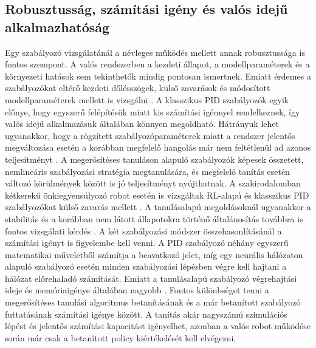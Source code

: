 \documentclass[12pt,a4paper]{report}
\begin{document}
	\subsection{Robusztusság, számítási igény és valós idejű alkalmazhatóság}
	Egy szabályozó vizsgálatánál a névleges működés mellett annak robusztussága is fontos szempont. A valós rendszerben a kezdeti állapot, a modellparaméterek és a környezeti hatások sem tekinthetők mindig pontosan ismertnek. Emiatt érdemes a szabályozókat eltérő kezdeti dőlésszögek, külső zavarások és módosított modellparaméterek mellett is vizsgálni \cite{busoniu2018,zhangnor2025}.
	\newline
	\newline
	A klasszikus PID szabályozók egyik előnye, hogy egyszerű felépítésük miatt kis számítási igénnyel rendelkeznek, így valós idejű alkalmazásuk általában könnyen megoldható. Hátrányuk lehet ugyanakkor, hogy a rögzített szabályozóparaméterek miatt a rendszer jelentős megváltozása esetén a korábban megfelelő hangolás már nem feltétlenül ad azonos teljesítményt \cite{zhangnor2025}.
	\newline
	\newline
	A megerősítéses tanuláson alapuló szabályozók képesek összetett, nemlineáris szabályozási stratégia megtanulására, és megfelelő tanítás esetén változó körülmények között is jó teljesítményt nyújthatnak. A szakirodalomban kétkerekű önkiegyensúlyozó robot esetén is vizsgáltak RL-alapú és klasszikus PID szabályozókat külső zavarás mellett \cite{hernandez2024}. A tanulásalapú megoldásoknál ugyanakkor a stabilitás és a korábban nem látott állapotokra történő általánosítás továbbra is fontos vizsgálati kérdés \cite{busoniu2018}.
	\newline
	\newline
	A két szabályozási módszer összehasonlításánál a számítási igényt is figyelembe kell venni. A PID szabályozó néhány egyszerű matematikai műveletből számítja a beavatkozó jelet, míg egy neurális hálózaton alapuló szabályozó esetén minden szabályozási lépésben végre kell hajtani a hálózat előrehaladó számítását. Emiatt a tanulásalapú szabályozó végrehajtási ideje és memóriaigénye általában nagyobb \cite{zhangnor2025}.
	\newline
	\newline
	Fontos különbséget tenni a megerősítéses tanulási algoritmus betanításának és a már betanított szabályozó futtatásának számítási igénye között. A tanítás akár nagyszámú szimulációs lépést és jelentős számítási kapacitást igényelhet, azonban a valós robot működése során már csak a betanított policy kiértékelését kell elvégezni.
\end{document}
